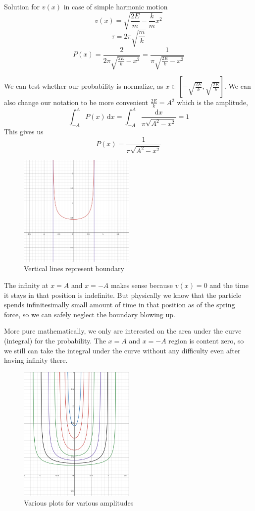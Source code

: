 \documentclass[letter]{article}
\begin{document}
	Solution for $v(x)$ in case of simple harmonic motion 
	\[
		v(x) = \sqrt{\frac{2E}{m} - \frac{k}{m} x^2}  \]
	\[
	\tau = 2 \pi \sqrt{\frac{m}{k}} 
	\]
	\[
	P(x) = \frac{2}{2 \pi \sqrt{\frac{2E}{k} - x^2} } = \frac{1}{ \pi \sqrt{\frac{2E}{k} - x^2} }
	\]

	We can test whether our probability is normalize, as $x \in \left[-\sqrt{  \frac{2E}{k}}, \sqrt{ \frac{2E}{k} } \right]$. We can also change our notation to be more convenient $\frac{2E}{k} = A^2$ which is the amplitude, 
	\[
	\int_{-A}^{A} P(x) \, \mathrm{d} x =  \int_{-A}^{A} \frac{\mathrm{d}  x}{\pi \sqrt{A^2 - x^2} } = 1 
	\] 
	This gives us 
	\[
	\boxed{
	P(x) = \frac{1}{\pi \sqrt{A^2 - x^2} }
	}
	\] 

	\begin{figure}[H]
		\centering
		\includegraphics[width=0.5\textwidth]{ss/ncl01.png}
		\caption{Vertical lines represent boundary}
		\label{fig:ss-ncl01-png}
	\end{figure}
	The infinity at $x = A$ and $x = -A$ makes sense because $v(x) = 0$ and the time it stays in that position is indefinite. But physically we know that the particle spends infinitesimally small amount of time in that position as  of the spring force, so we can safely neglect the boundary blowing up. 

	More pure mathematically, we only are interested on the area under the curve (integral) for the probability. The $x = A$ and $x = -A$ region is content zero, so we still can take the integral under the curve without any difficulty even after having infinity there.  
	\begin{figure}[H]
		\centering
		\includegraphics[width=0.5\textwidth]{ss/ncl02.png}
		\caption{Various plots for various amplitudes}
		\label{fig:ss-ncl01-png}
	\end{figure}
\end{document}
